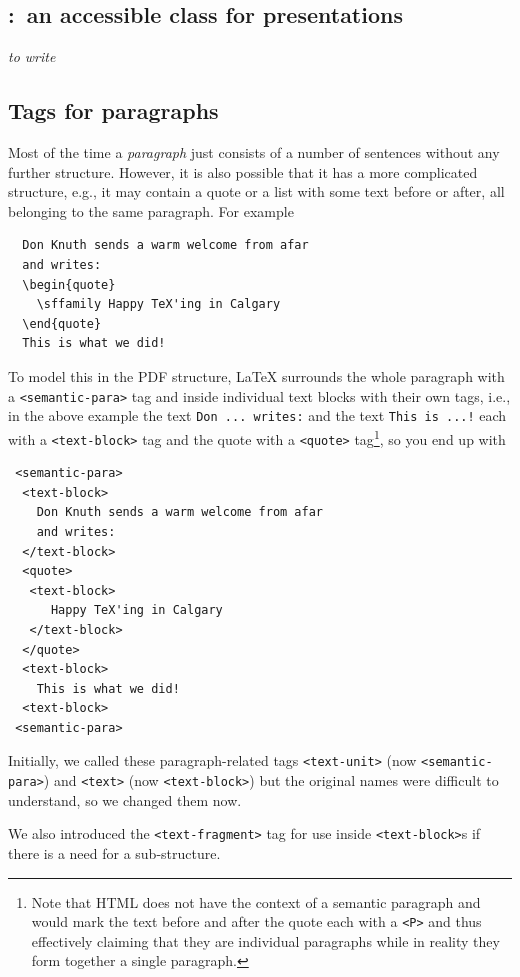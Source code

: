 \documentclass{ltnews}
\providecommand\struct[1]{\texttt{<#1>}}
\let\cls\pkg
\begin{document}
\subsection{\cls{ltx-talk}:\ an accessible class for presentations}

  \emph{to write}

 

\subsection{Tags for paragraphs}

Most of the time a \emph{paragraph} just consists of a number of
sentences without any further structure. However, it is also possible
that it has a more complicated structure, e.g., it may contain a quote
or a list with some text before or after, all belonging to the same
paragraph. For example
\begin{verbatim}
  Don Knuth sends a warm welcome from afar
  and writes:
  \begin{quote}
    \sffamily Happy TeX'ing in Calgary
  \end{quote}
  This is what we did!
\end{verbatim}
To model this in the PDF structure, \LaTeX{} surrounds the whole
paragraph with a \struct{semantic-para} tag and inside individual text
blocks with their own tags, i.e., in the above example the text
\texttt{Don ... writes:} and the text \texttt{This is ...!} each with
a \struct{text-block} tag and the quote with a \struct{quote}
tag\footnote{Note that HTML does not have the context of a semantic
paragraph and would mark the text before and after the quote each with
a \struct{P} and thus effectively claiming that they are individual
paragraphs while in reality they form together a single paragraph.},
so you end up with
\begin{verbatim}
 <semantic-para>
  <text-block>
    Don Knuth sends a warm welcome from afar
    and writes:
  </text-block>
  <quote>
   <text-block>
      Happy TeX'ing in Calgary
   </text-block>
  </quote>
  <text-block>
    This is what we did!
  <text-block>
 <semantic-para>
\end{verbatim}

Initially, we called these paragraph-related tags \struct{text-unit}
(now \struct{semantic-para}) and \struct{text} (now
\struct{text-block}) but the original names were difficult to
understand, so we changed them now.

We also introduced the \struct{text-fragment} tag for use inside
\struct{text-block}s if there is a need for a sub-structure.
\end{document}

